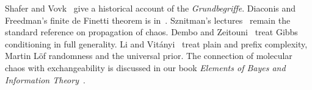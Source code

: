 Shafer and Vovk~\cite{shafervovk2006} give a historical account of the \emph{Grundbegriffe}. Diaconis and Freedman's finite de Finetti theorem is in~\cite{diaconisfreedman1980}. Sznitman's lectures~\cite{sznitman1991} remain the standard reference on propagation of chaos. Dembo and Zeitouni~\cite{dembozeitouni} treat Gibbs conditioning in full generality. Li and Vit\'anyi~\cite{livitanyi2008} treat plain and prefix complexity, Martin L\"of randomness and the universal prior. The connection of molecular chaos with exchangeability is discussed in our book \emph{Elements of Bayes and Information Theory}~\cite{polsonsokolovelements}.
